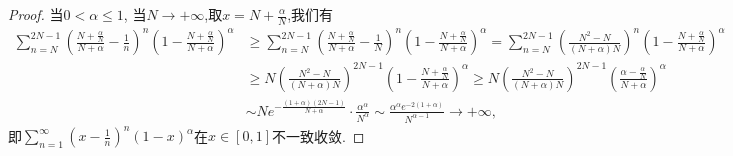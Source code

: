 \documentclass[../../main.tex]{subfiles}%
\begin{document}
\begin{proof}
当$0<\alpha\leqslant1$, 当$N\to+\infty$,取$x=N+\frac{\alpha}{N}$,我们有
$$
\begin{aligned}
\sum_{n=N}^{2N-1}{\left( \frac{N+\frac{\alpha}{N}}{N+\alpha}-\frac{1}{n} \right) ^n\left( 1-\frac{N+\frac{\alpha}{N}}{N+\alpha} \right) ^{\alpha}}&\geqslant \sum_{n=N}^{2N-1}{\left( \frac{N+\frac{\alpha}{N}}{N+\alpha}-\frac{1}{N} \right) ^n\left( 1-\frac{N+\frac{\alpha}{N}}{N+\alpha} \right) ^{\alpha}}
=\sum_{n=N}^{2N-1}{\left( \frac{N^2-N}{(N+\alpha )N} \right) ^n\left( 1-\frac{N+\frac{\alpha}{N}}{N+\alpha} \right) ^{\alpha}}
\\
&\geqslant N\left( \frac{N^2-N}{(N+\alpha )N} \right) ^{2N-1}\left( 1-\frac{N+\frac{\alpha}{N}}{N+\alpha} \right) ^{\alpha}
\geqslant N\left( \frac{N^2-N}{(N+\alpha )N} \right) ^{2N-1}\left( \frac{\alpha -\frac{\alpha}{N}}{N+\alpha} \right) ^{\alpha}
\\
&\sim Ne^{-\frac{\left( 1+\alpha \right) \left( 2N-1 \right)}{N+\alpha}}\cdot \frac{\alpha ^{\alpha}}{N^{\alpha}}\sim \frac{\alpha ^{\alpha}e^{-2\left( 1+\alpha \right)}}{N^{\alpha -1}}\rightarrow +\infty ,
\end{aligned}
$$
即$\sum\limits_{n=1}^{\infty}\left(x-\frac{1}{n}\right)^n(1-x)^\alpha$在$x\in[0,1]$不一致收敛.
\end{proof}
\end{document}
